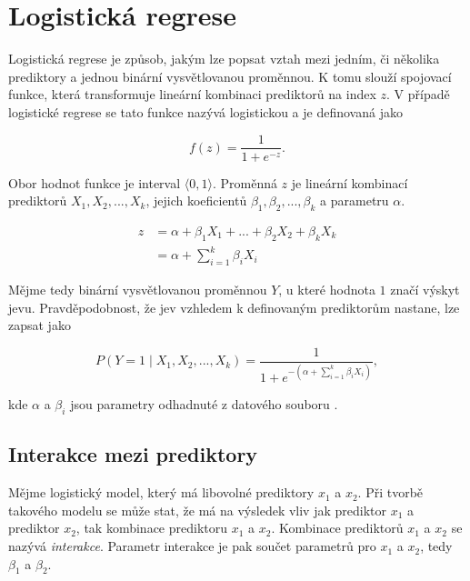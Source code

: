 \newpage
\section{Logistická regrese}
Logistická regrese je způsob, jakým lze popsat vztah mezi jedním, či několika prediktory a jednou binární vysvětlovanou 
proměnnou. K tomu slouží spojovací funkce, která transformuje lineární kombinaci prediktorů na index $z$. V případě
logistické regrese se tato funkce nazývá logistickou a je definovaná jako

\begin{equation}
    \label{eq:logisticka_funkce}
    f(z) = \frac{1}{1 + e^{-z}}.
\end{equation}

Obor hodnot funkce je interval $\langle 0, 1 \rangle$. Proměnná $z$ je lineární kombinací prediktorů  $X_1, X_2, ..., X_k$, 
jejich koeficientů $\beta_1, \beta_2, ..., \beta_k$ a parametru $\alpha$.

\begin{equation}
    \label{eq:linearni_kombinace_z}
    \begin{split}
        z &= \alpha + \beta_1 X_1 + ... + \beta_2 X_2 +\beta_k X_k \\
          &= \alpha + \sum_{i=1}^k \beta_i X_i
    \end{split}
\end{equation}

Mějme tedy binární vysvětlovanou proměnnou $Y$, u které hodnota $1$ značí výskyt jevu. Pravděpodobnost, že jev
vzhledem k definovaným prediktorům nastane, lze zapsat jako

\begin{equation}
    \label{eq:pravdepodobnost_y}
    P(Y = 1 \mid X_1, X_2, ..., X_k) = \frac{1}{1 + e^{- \left( \alpha + \sum_{i=1}^k \beta_i X_i \right) }},
\end{equation}

kde $\alpha$ a $\beta_i$ jsou parametry odhadnuté z datového souboru \cite{kleinbaum_logistic_2010}.

\subsection{Interakce mezi prediktory}
Mějme logistický model, který má libovolné prediktory $x_1$ a $x_2$. Při tvorbě takového modelu se může stat, že má na výsledek vliv jak prediktor $x_1$ a prediktor
$x_2$, tak kombinace prediktoru $x_1$ a $x_2$. Kombinace prediktorů $x_1$ a $x_2$ se nazývá \textit{interakce}. Parametr interakce je pak součet parametrů pro $x_1$ a $x_2$,
tedy $\beta_1$ a $\beta_2$.

